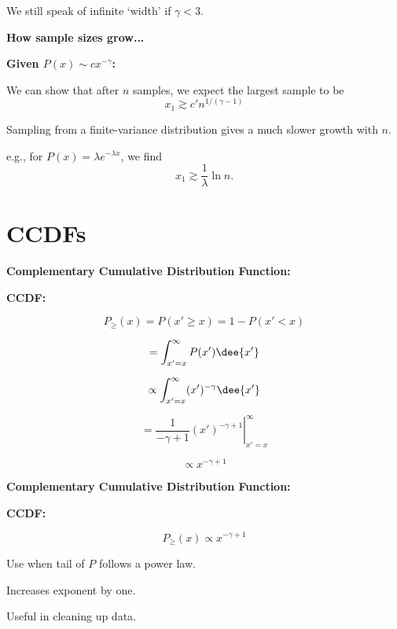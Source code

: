       We still speak of infinite `width' if $\gamma < 3$.
    
  



  \textbf{How sample sizes grow...}

  \textbf{Given $P(x) \sim c x^{-\gamma}$:}
    
     
      We can show that after $n$ samples,
      we expect the largest sample to be 
      $$ x_{1} \gtrsim c' n^{1/(\gamma-1)} $$
     
      Sampling from a 
      finite-variance distribution 
      gives a much slower growth with $n$.
     
      e.g., for $P(x) = \lambda e^{-\lambda x}$,
      we find
      $$ x_{1} \gtrsim \frac{1}{\lambda} \ln n. $$
    
  



\section{CCDFs}

  \textbf{\small Complementary Cumulative Distribution Function:}

  \textbf{CCDF:}
    
    
      $$ P_{\ge}(x) = P(x' \ge x)  = 1 - P(x'<x) $$
    
      $$ = \int_{x' = x}^{\infty} P(x') \dee{x'}  $$
    
      $$ \propto \int_{x' = x}^{\infty} (x')^{-\gamma} \dee{x'}  $$
    
      $$ = \left. \frac{1}{-\gamma+1}(x')^{-\gamma+1} \right|_{x' = x}^{\infty} $$
    
      $$ \propto x^{-\gamma+1} $$
    
  


  \textbf{\small Complementary Cumulative Distribution Function:}

  \textbf{CCDF:}
    
    
      $$ P_{\ge}(x) \propto x^{-\gamma+1} $$
    
      Use when tail of $P$ follows a power law.
    
      Increases exponent by one.
    
      Useful in cleaning up data.
    
  

